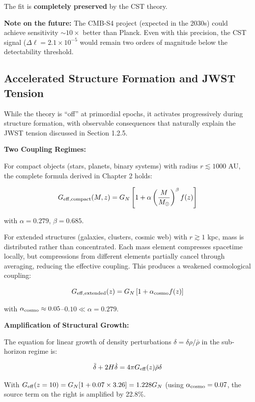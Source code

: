 \documentclass[11pt,a4paper]{article}
\begin{document}
The \cite{PlanckCollaboration2020a} fit is \textbf{completely preserved} by the CST theory.

\textbf{Note on the future:} The CMB-S4 project (expected in the 2030s)
could achieve sensitivity \(\sim 10\times\) better than Planck. Even
with this precision, the CST signal (\(\Delta\ell = 2.1\times10^{-5}\)
would remain two orders of magnitude below the detectability threshold.

\hypertarget{accelerated-structure-formation-and-jwst-tension}{%
\subsection{Accelerated Structure Formation and JWST
Tension}\label{accelerated-structure-formation-and-jwst-tension}}

While the theory is ``off'' at primordial epochs, it activates
progressively during structure formation, with observable consequences
that naturally explain the JWST tension discussed in Section 1.2.5.

\textbf{Two Coupling Regimes:}

For compact objects (stars, planets, binary systems) with radius
\(r \lesssim 1000\) AU, the complete formula derived in Chapter 2 holds:

\[G_{\rm eff,compact}(M,z) = G_N\left[1 + \alpha \left(\frac{M}{M_\odot}\right)^\beta f(z)\right]\]

with \(\alpha = 0.279\), \(\beta = 0.685\).

For extended structures (galaxies, clusters, cosmic web) with
\(r \gtrsim 1\) kpc, mass is distributed rather than concentrated. Each
mass element compresses spacetime locally, but compressions from
different elements partially cancel through averaging, reducing the
effective coupling. This produces a weakened cosmological coupling:

\[G_{\rm eff,extended}(z) = G_N\left[1 + \alpha_{\rm cosmo} f(z)\right]\]

with \(\alpha_{\rm cosmo} \approx 0.05\)--\(0.10 \ll \alpha = 0.279\).

\textbf{Amplification of Structural Growth:}

The equation for linear growth of density perturbations
\(\delta = \delta\rho/\bar\rho\) in the sub-horizon regime is:

\[\ddot{\delta} + 2H\dot{\delta} = 4\pi G_{\rm eff}(z) \bar\rho \delta\]

With \(G_{\rm eff}(z=10) = G_N[1 + 0.07 \times 3.26] = 1.228 G_N\)
(using \(\alpha_{\rm cosmo} = 0.07\), the source term on the right is
amplified by 22.8\%.
\end{document}
